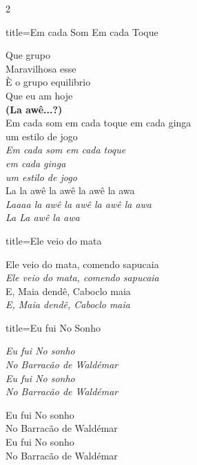 \documentclass[fontsize=14pt, paper=a4, twoside, DIV=20]{scrreprt} %
\begin{document}
\begin{multicols*}{2}
\begin{song}{title={Em cada Som Em cada Toque}}
\begin{verse*}
            Que grupo\\
            Maravilhosa esse\\
            È o grupo equilibrio\\
            Que eu am hoje\\
            \textbf{(La awê...?)}\\
            Em cada som em cada toque em cada ginga\\
            um estilo de jogo\\
            \textit{Em cada som em cada toque\\
            em cada ginga}\\
            \textit{um estilo de jogo}\\
            La la awê la awê la awê la awa\\
            \textit{Laaaa la awê la awê la awê la awa}\\
            \textit{La La awê la awa}\\
        \end{verse*}
\end{song}

\begin{song}{title={Ele veio do mata}}
        \begin{verse*}
            Ele veio do mata, comendo sapucaia\\
            \textit{Ele veio do mata, comendo sapucaia} \\
            E, Maia dendê, Caboclo maia \\
            \textit{E, Maia dendê, Caboclo maia} \\
        \end{verse*}
\end{song}

\begin{song}{title={Eu fui No Sonho}}
    \begin{chorus*}
            \textit{Eu fui No sonho\\
            No Barracão de Waldémar\\
            Eu fui No sonho\\
            No Barracão de Waldémar\\}
    \end{chorus*}
    \begin{verse*}

            Eu fui No sonho\\
            No Barracão de Waldémar\\
            Eu fui No sonho\\
            No Barracão de Waldémar\\


\end{verse*}
\end{song}
\end{multicols*}
\end{document}
